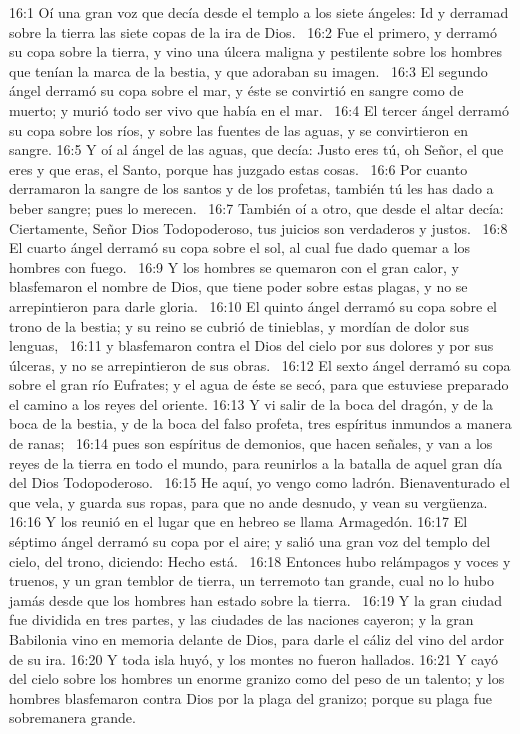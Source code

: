 16:1 Oí una gran voz que decía desde el templo a los siete ángeles: Id y derramad sobre la tierra las siete copas de la ira de Dios.  
16:2 Fue el primero, y derramó su copa sobre la tierra, y vino una úlcera maligna y pestilente sobre los hombres que tenían la marca de la bestia, y que adoraban su imagen.  
16:3 El segundo ángel derramó su copa sobre el mar, y éste se convirtió en sangre como de muerto; y murió todo ser vivo que había en el mar.  
16:4 El tercer ángel derramó su copa sobre los ríos, y sobre las fuentes de las aguas, y se convirtieron en sangre. 
16:5 Y oí al ángel de las aguas, que decía: Justo eres tú, oh Señor, el que eres y que eras, el Santo, porque has juzgado estas cosas.  
16:6 Por cuanto derramaron la sangre de los santos y de los profetas, también tú les has dado a beber sangre; pues lo merecen.  
16:7 También oí a otro, que desde el altar decía: Ciertamente, Señor Dios Todopoderoso, tus juicios son verdaderos y justos.  
16:8 El cuarto ángel derramó su copa sobre el sol, al cual fue dado quemar a los hombres con fuego.  
16:9 Y los hombres se quemaron con el gran calor, y blasfemaron el nombre de Dios, que tiene poder sobre estas plagas, y no se arrepintieron para darle gloria.  
16:10 El quinto ángel derramó su copa sobre el trono de la bestia; y su reino se cubrió de tinieblas, y mordían de dolor sus lenguas,  
16:11 y blasfemaron contra el Dios del cielo por sus dolores y por sus úlceras, y no se arrepintieron de sus obras.  
16:12 El sexto ángel derramó su copa sobre el gran río Eufrates; y el agua de éste se secó, para que estuviese preparado el camino a los reyes del oriente. 
16:13 Y vi salir de la boca del dragón, y de la boca de la bestia, y de la boca del falso profeta, tres espíritus inmundos a manera de ranas;  
16:14 pues son espíritus de demonios, que hacen señales, y van a los reyes de la tierra en todo el mundo, para reunirlos a la batalla de aquel gran día del Dios Todopoderoso.  
16:15 He aquí, yo vengo como ladrón. Bienaventurado el que vela, y guarda sus ropas, para que no ande desnudo, y vean su vergüenza.  
16:16 Y los reunió en el lugar que en hebreo se llama Armagedón. 
16:17 El séptimo ángel derramó su copa por el aire; y salió una gran voz del templo del cielo, del trono, diciendo: Hecho está.  
16:18 Entonces hubo relámpagos y voces y truenos, y un gran temblor de tierra, un terremoto tan grande, cual no lo hubo jamás desde que los hombres han estado sobre la tierra.  
16:19 Y la gran ciudad fue dividida en tres partes, y las ciudades de las naciones cayeron; y la gran Babilonia vino en memoria delante de Dios, para darle el cáliz del vino del ardor de su ira. 
16:20 Y toda isla huyó, y los montes no fueron hallados. 
16:21 Y cayó del cielo sobre los hombres un enorme granizo como del peso de un talento; y los hombres blasfemaron contra Dios por la plaga del granizo; porque su plaga fue sobremanera grande.  
